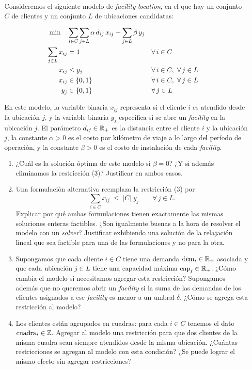 \documentclass[11pt,a4paper]{article}
\begin{document}

Consideremos el siguiente modelo de \emph{facility location}, en el que hay un
conjunto $C$ de clientes y un conjunto $L$ de ubicaciones candidatas:

\begin{align}
\min \quad & \sum_{i \in C} \sum_{j \in L} \alpha\, d_{ij}\, x_{ij}
           + \sum_{j \in L} \beta\, y_j \\
\sum_{j \in L} x_{ij} &= 1 && \forall\, i \in C \\
x_{ij} &\le y_j && \forall\, i \in C,\ \forall\, j \in L \\
x_{ij} &\in \{0,1\} && \forall\, i \in C,\ \forall\, j \in L \notag \\
y_j &\in \{0,1\} && \forall\, j \in L \notag
\end{align}

En este modelo, la variable binaria $x_{ij}$ representa si el cliente $i$ es
atendido desde la ubicación $j$, y la variable binaria $y_j$ especifica si se
abre un \emph{facility} en la ubicación $j$. El parámetro $d_{ij} \in \mathbb{R}_+$ es la
distancia entre el cliente $i$ y la ubicación $j$, la constante $\alpha > 0$ es el
costo por kilómetro de viaje a lo largo del período de operación, y la constante
$\beta > 0$ es el costo de instalación de cada \emph{facility}.

\begin{enumerate}
  \item ¿Cuál es la solución óptima de este modelo si $\beta = 0$? ¿Y si además
  eliminamos la restricción (3)? Justificar en ambos casos.

  \item Una formulación alternativa reemplaza la restricción (3) por
  \[
  \sum_{i \in C} x_{ij} \;\le\; |C|\; y_j \qquad \forall\, j \in L .
  \]
  Explicar por qué ambas formulaciones tienen exactamente las mismas soluciones
  enteras factibles. ¿Son igualmente buenas a la hora de resolver el modelo con
  un \emph{solver}? Justificar exhibiendo una solución de la relajación lineal
  que sea factible para una de las formulaciones y no para la otra.

  \item Supongamos que cada cliente $i \in C$ tiene una demanda
  $\mathrm{dem}_i \in \mathbb{R}_+$ asociada y que cada ubicación $j \in L$ tiene una capacidad
  máxima $\mathrm{cap}_j \in \mathbb{R}_+$. ¿Cómo cambia el modelo si necesitamos agregar esta
  restricción? Supongamos además que no queremos abrir un \emph{facility} si la
  suma de las demandas de los clientes asignados a ese \emph{facility} es menor
  a un umbral $\delta$. ¿Cómo se agrega esta restricción al modelo?

  \item Los clientes están agrupados en cuadras: para cada $i \in C$ tenemos el
  dato $\mathrm{cuadra}_i \in \mathbb{Z}$. Agregar al modelo una restricción para que
  dos clientes de la misma cuadra sean siempre atendidos desde la misma
  ubicación. ¿Cuántas restricciones se agregan al modelo con esta condición?
  ¿Se puede lograr el mismo efecto sin agregar restricciones?
\end{enumerate}
\end{document}
